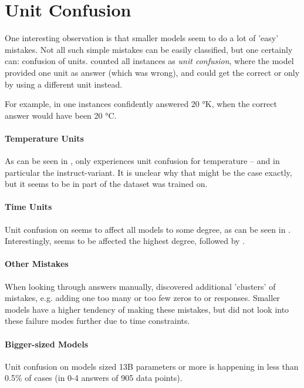 \section{Unit Confusion}\label{sec:unitconfusion}


One interesting observation is that smaller models seem to do a lot of 'easy' mistakes.
Not all such simple mistakes can be easily classified, but one certainly can: confusion of units.
 counted all instances as \textit{unit confusion}, where the model provided one unit as answer (which was wrong), and  could get the correct \ttemp or \ttime only by using a different unit instead.

For example, in one instances  confidently answered 20 °K, when the correct answer would have been 20 °C.

\paragraph{Temperature Units}
As can be seen in , only  experiences unit confusion for temperature -- and in particular the instruct-variant.
It is unclear why that might be the case exactly, but it seems to be in part of the dataset  was trained on.

\paragraph{Time Units}
Unit confusion on \ttime seems to affect all models to some degree, as can be seen in .
Interestingly,  seems to be affected the highest degree, followed by .

\paragraph{Other Mistakes}
When looking through answers manually,  discovered additional 'clusters' of mistakes, e.g. adding one too many or too few zeros to \ttime or \ttemp responses.
Smaller models have a higher tendency of making these mistakes, but  did not look into these failure modes further due to time constraints.

\paragraph{Bigger-sized Models}
Unit confusion on models sized 13B parameters or more is happening in less than 0.5\% of cases (in 0-4 answers of 905 data points).

